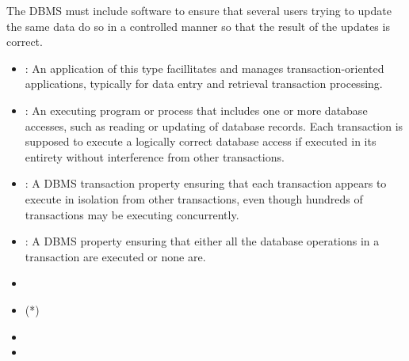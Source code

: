    \par The DBMS must include  software to ensure
    that several users trying to update the same data do so in a controlled
    manner so that the result of the updates is correct.
    \begin{itemize}
      \item {}: An application of this
        type facillitates and manages transaction-oriented applications,
        typically for data entry and retrieval transaction processing.
      \item {}: An executing program or process that includes
        one or more database accesses, such as reading or updating of
        database records. Each transaction is supposed to execute a logically
        correct database access if executed in its entirety without
        interference from other transactions.
      \item {}: A DBMS transaction property ensuring that each
        transaction appears to execute in isolation from other transactions,
        even though hundreds of transactions may be executing concurrently.
      \item {}: A DBMS property ensuring that either all the
        database operations in a transaction are executed or none are.
    \end{itemize}

  \begin{itemize}
    \item {}
    \item {} (*)
    \item {}
    \item {}
  \end{itemize}
